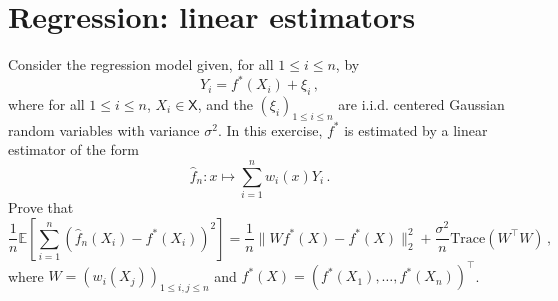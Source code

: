 \documentclass[a4paper,10pt,fleqn]{article}
\newcommand{\eqsp}{\,}
\newcommand{\xset}{\ensuremath{\mathsf{X}}}
\newcommand{\1}{\ensuremath{\mathbbm{1}}}
\newcommand{\bE}{\mathbb{E}}
\begin{document}
\section{Regression: linear estimators}
Consider the regression model given, for all $1\leqslant i\leqslant n$, by
$$
Y_{i}=f^*(X_{i})+\xi_{i}\eqsp,
$$
where for all $1\leqslant i\leqslant n$, $X_i\in\xset$, and the $(\xi_{i})_{1\leqslant i \leqslant n}$ are i.i.d. centered Gaussian random variables with variance $\sigma^2$. In this exercise, $f^*$ is estimated by a linear estimator of the form
$$
\widehat f_n: x \mapsto \sum_{i = 1}^n w_i(x)Y_i\eqsp.
$$
Prove that
$$
\frac{1}{n}\bE\left[\sum_{i=1}^n(\widehat f_n(X_i) - f^*(X_i))^2\right] = \frac{1}{n}\|Wf^*(X) - f^*(X)\|_2^2 + \frac{\sigma^2}{n}\mathrm{Trace}(W^\top W)\eqsp, 
$$
where $W = (w_i(X_j))_{1\leqslant i,j \leqslant n}$ and $f^*(X) = (f^*(X_1),\ldots,f^*(X_n))^\top$.

%
\end{document}
